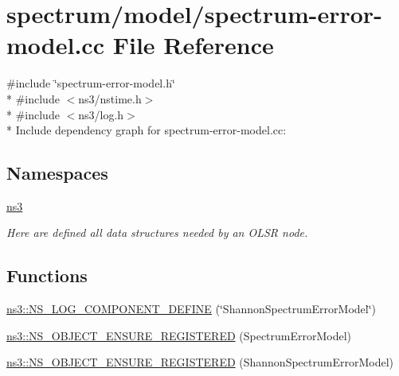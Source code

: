 \hypertarget{spectrum-error-model_8cc}{}\section{spectrum/model/spectrum-\/error-\/model.cc File Reference}
\label{spectrum-error-model_8cc}
{\ttfamily \#include \char`\"{}spectrum-\/error-\/model.\+h\char`\"{}}\\*
{\ttfamily \#include $<$ns3/nstime.\+h$>$}\\*
{\ttfamily \#include $<$ns3/log.\+h$>$}\\*
Include dependency graph for spectrum-\/error-\/model.cc\+:
\subsection*{Namespaces}
\begin{DoxyCompactItemize}
\item 
 \hyperlink{namespacens3}{ns3}
\begin{DoxyCompactList}\small\item\em Here are defined all data structures needed by an O\+L\+SR node. \end{DoxyCompactList}\end{DoxyCompactItemize}
\subsection*{Functions}
\begin{DoxyCompactItemize}
\item 
\hyperlink{namespacens3_a02d678c7d52f12cd141a0b0699d87a94}{ns3\+::\+N\+S\+\_\+\+L\+O\+G\+\_\+\+C\+O\+M\+P\+O\+N\+E\+N\+T\+\_\+\+D\+E\+F\+I\+NE} (\char`\"{}Shannon\+Spectrum\+Error\+Model\char`\"{})
\item 
\hyperlink{namespacens3_aa7bf78a472226436e2e1a26665e92119}{ns3\+::\+N\+S\+\_\+\+O\+B\+J\+E\+C\+T\+\_\+\+E\+N\+S\+U\+R\+E\+\_\+\+R\+E\+G\+I\+S\+T\+E\+R\+ED} (Spectrum\+Error\+Model)
\item 
\hyperlink{namespacens3_af52d5d5e38e4665d3d45bf7b4f10c977}{ns3\+::\+N\+S\+\_\+\+O\+B\+J\+E\+C\+T\+\_\+\+E\+N\+S\+U\+R\+E\+\_\+\+R\+E\+G\+I\+S\+T\+E\+R\+ED} (Shannon\+Spectrum\+Error\+Model)
\end{DoxyCompactItemize}
